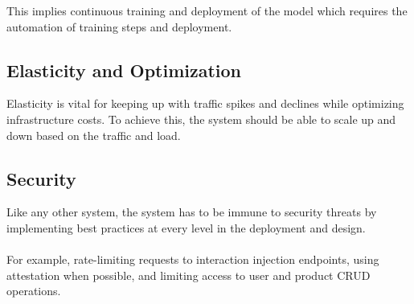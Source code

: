 This implies continuous training and deployment of the model which requires the automation of training steps and deployment.

\subsection{Elasticity and Optimization}

Elasticity is vital for keeping up with traffic spikes and declines while optimizing infrastructure costs. To achieve this, the system should be able to scale up and down based on the traffic and load.

\subsection{Security}

Like any other system, the system has to be immune to security threats by implementing best practices at every level in the deployment and design. \\ \\
For example, rate-limiting requests to interaction injection endpoints, using attestation when possible, and limiting access to user and product CRUD operations.
 